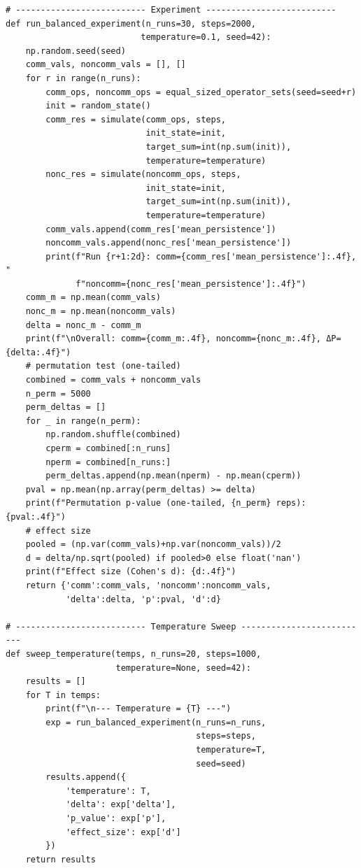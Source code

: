 \documentclass[11pt]{article}
\begin{document}
\begin{lstlisting}
# -------------------------- Experiment --------------------------
def run_balanced_experiment(n_runs=30, steps=2000,
                           temperature=0.1, seed=42):
    np.random.seed(seed)
    comm_vals, noncomm_vals = [], []
    for r in range(n_runs):
        comm_ops, noncomm_ops = equal_sized_operator_sets(seed=seed+r)
        init = random_state()
        comm_res = simulate(comm_ops, steps,
                            init_state=init,
                            target_sum=int(np.sum(init)),
                            temperature=temperature)
        nonc_res = simulate(noncomm_ops, steps,
                            init_state=init,
                            target_sum=int(np.sum(init)),
                            temperature=temperature)
        comm_vals.append(comm_res['mean_persistence'])
        noncomm_vals.append(nonc_res['mean_persistence'])
        print(f"Run {r+1:2d}: comm={comm_res['mean_persistence']:.4f}, "
              f"noncomm={nonc_res['mean_persistence']:.4f}")
    comm_m = np.mean(comm_vals)
    nonc_m = np.mean(noncomm_vals)
    delta = nonc_m - comm_m
    print(f"\nOverall: comm={comm_m:.4f}, noncomm={nonc_m:.4f}, ΔP={delta:.4f}")
    # permutation test (one‑tailed)
    combined = comm_vals + noncomm_vals
    n_perm = 5000
    perm_deltas = []
    for _ in range(n_perm):
        np.random.shuffle(combined)
        cperm = combined[:n_runs]
        nperm = combined[n_runs:]
        perm_deltas.append(np.mean(nperm) - np.mean(cperm))
    pval = np.mean(np.array(perm_deltas) >= delta)
    print(f"Permutation p‑value (one‑tailed, {n_perm} reps): {pval:.4f}")
    # effect size
    pooled = (np.var(comm_vals)+np.var(noncomm_vals))/2
    d = delta/np.sqrt(pooled) if pooled>0 else float('nan')
    print(f"Effect size (Cohen's d): {d:.4f}")
    return {'comm':comm_vals, 'noncomm':noncomm_vals,
            'delta':delta, 'p':pval, 'd':d}

# -------------------------- Temperature Sweep --------------------------
def sweep_temperature(temps, n_runs=20, steps=1000,
                      temperature=None, seed=42):
    results = []
    for T in temps:
        print(f"\n--- Temperature = {T} ---")
        exp = run_balanced_experiment(n_runs=n_runs,
                                      steps=steps,
                                      temperature=T,
                                      seed=seed)
        results.append({
            'temperature': T,
            'delta': exp['delta'],
            'p_value': exp['p'],
            'effect_size': exp['d']
        })
    return results


\end{lstlisting}
\end{document}
